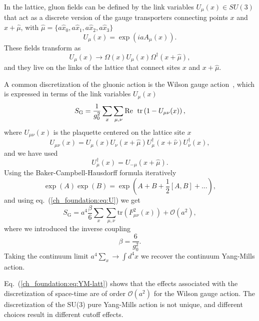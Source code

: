 In the lattice, gluon fields can be defined by the link variables $U_{\mu}(x)\in SU(3)$ that act as a discrete version of the gauge transporters connecting points $x$ and $x+\hat{\mu}$, with $\hat{\mu}=\{a\hat{x}_0,a\hat{x}_1,a\hat{x}_2,a\hat{x}_3\}$
\begin{equation}
\label{ch_foundation:eq:U}
U_{\mu}(x)=\exp\left(iaA_{\mu}(x)\right).
\end{equation}
These fields transform as 
\begin{equation}
\label{ch_foundation:eq:U_transf}
U_{\mu}(x)\to\Omega(x)U_{\mu}(x)\Omega^{\dagger}(x+\hat{\mu}),
\end{equation}
and they live on the links of the lattice that connect sites $x$ and $x+\hat{\mu}$.

A common discretization of the gluonic action is the Wilson gauge action~\citep{Wilson:1974sk}, which is expressed in terms of the link variables $U_{\mu}(x)$
\begin{equation}
\label{ch_foundation:eq:SG}
S_{\textrm{G}}=\frac{1}{g_0^2}\sum_x\sum_{\mu,\nu}{\textrm{Re\; tr}}\left(1-U_{\mu\nu}(x)\right),
\end{equation} 
where $U_{\mu\nu}(x)$ is the plaquette centered on the lattice site $x$
\begin{equation}
\label{ch_foundation:eq:plaq}
U_{\mu\nu}(x)=U_{\mu}(x)U_{\nu}(x+\hat{\mu})U_{\mu}^{\dagger}(x+\hat{\nu})U_{\nu}^{\dagger}(x),
\end{equation}
and we have used 
\begin{equation}
U_{\mu}^{\dagger}(x)=U_{-\mu}(x+\hat{\mu}).
\end{equation}
Using the Baker-Campbell-Hausdorff formula iteratively
\begin{equation}
\exp\left(A\right)\exp\left(B\right)=\exp\left(A+B+\frac{1}{2}\left[A,B\right]+...\right),
\end{equation}
and using eq.~(\ref{ch_foundation:eq:U}) we get
\begin{equation}
\label{ch_foundation:eq:YM-latt}
S_{\textrm{G}}=a^4\frac{\beta}{6}\sum_x\sum_{\mu,\nu}{\textrm{tr}}\left(F_{\mu\nu}^2(x)\right)+\mathcal{O}(a^2),
\end{equation}
where we introduced the inverse coupling
\begin{equation}
\beta=\frac{6}{g_0^2}.
\end{equation}
Taking the continuum limit $a^4\sum_x\rightarrow\int d^4x$ we recover the continuum Yang-Mills action.

Eq.~(\ref{ch_foundation:eq:YM-latt}) shows that the effects associated with the discretization of space-time are of order $\mathcal{O}(a^2)$ for the Wilson gauge action. The discretization of the SU(3) pure Yang-Mills action is not unique, and different choices result in different cutoff effects.

